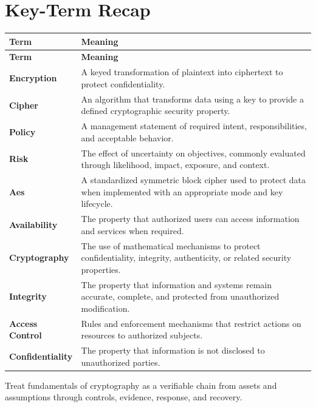 \documentclass[11pt]{article}
\begin{document}
\section*{Key-Term Recap}
\begin{longtable}{>{\RaggedRight\arraybackslash}p{}>{\RaggedRight\arraybackslash}p{}}
\toprule\rowcolor{Navy}\color{white}\textbf{Term} & \color{white}\textbf{Meaning}\\\midrule
\endfirsthead
\toprule\rowcolor{Navy}\color{white}\textbf{Term} & \color{white}\textbf{Meaning}\\\midrule
\endhead
\textbf{Encryption} & A keyed transformation of plaintext into ciphertext to protect confidentiality. \\\midrule
\textbf{Cipher} & An algorithm that transforms data using a key to provide a defined cryptographic security property. \\\midrule
\textbf{Policy} & A management statement of required intent, responsibilities, and acceptable behavior. \\\midrule
\textbf{Risk} & The effect of uncertainty on objectives, commonly evaluated through likelihood, impact, exposure, and context. \\\midrule
\textbf{Aes} & A standardized symmetric block cipher used to protect data when implemented with an appropriate mode and key lifecycle. \\\midrule
\textbf{Availability} & The property that authorized users can access information and services when required. \\\midrule
\textbf{Cryptography} & The use of mathematical mechanisms to protect confidentiality, integrity, authenticity, or related security properties. \\\midrule
\textbf{Integrity} & The property that information and systems remain accurate, complete, and protected from unauthorized modification. \\\midrule
\textbf{Access Control} & Rules and enforcement mechanisms that restrict actions on resources to authorized subjects. \\\midrule
\textbf{Confidentiality} & The property that information is not disclosed to unauthorized parties. \\\midrule
\bottomrule
\end{longtable}
\begin{takeawaybox}
Treat fundamentals of cryptography as a verifiable chain from assets and assumptions through controls, evidence, response, and recovery.
\end{takeawaybox}
\end{document}

